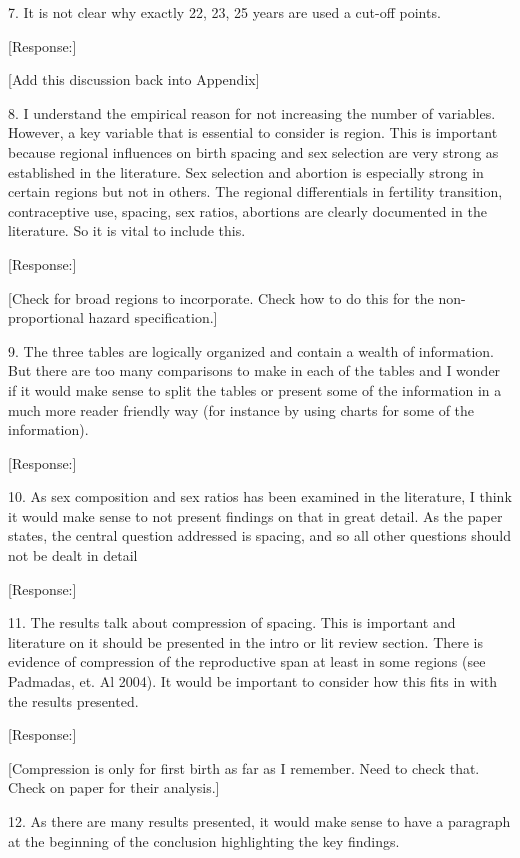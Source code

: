 \documentclass[letterpaper,12pt]{article}
\begin{document}
7. It is not clear why exactly 22, 23, 25 years are used a cut-off
points.

[Response:]

[Add this discussion back into Appendix]

8. I understand the empirical reason for not increasing the number of
variables. However, a key variable that is essential to consider is
region. This is important because regional influences on birth spacing
and sex selection are very strong as established in the literature. Sex
selection and abortion is especially strong in certain regions but not
in others. The regional differentials in fertility transition,
contraceptive use, spacing, sex ratios, abortions are clearly documented
in the literature. So it is vital to include this.

[Response:]

[Check for broad regions to incorporate. Check how to do this for the non-proportional
hazard specification.]

9. The three tables are logically organized and contain a wealth of
information. But there are too many comparisons to make in each of the
tables and I wonder if it would make sense to split the tables or
present some of the information in a much more reader friendly way (for
instance by using charts for some of the information). 

[Response:]

10. As sex composition and sex ratios has been examined in the literature, I think
it would make sense to not present findings on that in great detail. As
the paper states, the central question addressed is spacing, and so all
other questions should not be dealt in detail

[Response:]

11. The results talk about compression of spacing. This is important and
literature on it should be presented in the intro or lit review section.
There is evidence of compression of the reproductive span at least in
some regions (see Padmadas, et. Al 2004). It would be important to
consider how this fits in with the results presented.

[Response:]

[Compression is only for first birth as far as I remember. Need to check that.
Check on paper for their analysis.]


12. As there are many results presented, it would make sense to have a
paragraph at the beginning of the conclusion highlighting the key
findings.
\end{document}
